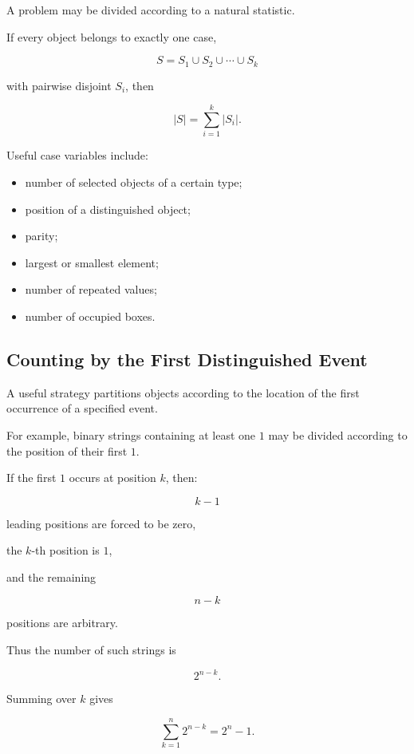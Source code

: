 A problem may be divided according to a natural statistic.

If every object belongs to exactly one case,

\[
S=S_1\cup S_2\cup\cdots\cup S_k
\]

with pairwise disjoint \(S_i\), then

\[
\boxed{
|S|
=
\sum_{i=1}^{k}|S_i|.
}
\]

Useful case variables include:

\begin{itemize}
    \item number of selected objects of a certain type;
    \item position of a distinguished object;
    \item parity;
    \item largest or smallest element;
    \item number of repeated values;
    \item number of occupied boxes.
\end{itemize}

\subsection{Counting by the First Distinguished Event}
\label{subsec:first-distinguished-event}

A useful strategy partitions objects according to the location of the
first occurrence of a specified event.

For example, binary strings containing at least one \(1\) may be divided
according to the position of their first \(1\).

If the first \(1\) occurs at position \(k\), then:

\[
k-1
\]

leading positions are forced to be zero,

the \(k\)-th position is \(1\),

and the remaining

\[
n-k
\]

positions are arbitrary.

Thus the number of such strings is

\[
2^{n-k}.
\]

Summing over \(k\) gives

\[
\sum_{k=1}^{n}2^{n-k}
=
2^n-1.
\]

